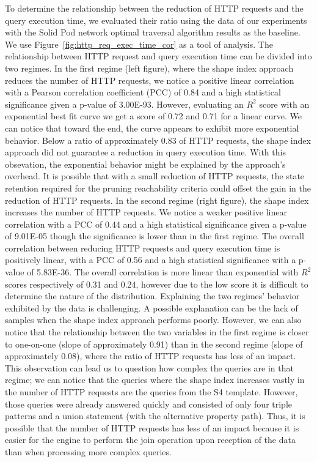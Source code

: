 To determine the relationship between the reduction of HTTP requests and the query execution time, we evaluated their ratio using 
the data of our experiments with the Solid Pod network optimal traversal algorithm results as the baseline.
We use Figure~\ref{fig:http_req_exec_time_cor} as a tool of analysis.
The relationship between HTTP request and query execution time can be divided into two regimes.
In the first regime (left figure), where the shape index approach reduces the number of HTTP requests, we notice a positive linear correlation with a
Pearson correlation coefficient (PCC) of 0.84 and a high statistical significance given a p-value of 3.00E-93.
However, evaluating an $R^2$ score with an exponential best fit curve we get a score of 0.72 and 0.71 for a linear curve.
We can notice that toward the end, the curve appears to exhibit more exponential behavior.
Below a ratio of approximately 0.83 of HTTP requests, the shape index approach did not guarantee a reduction in query execution time.
With this obsevation, the exponential behavior might be explained by the approach's overhead. 
It is possible that with a small reduction of HTTP requests, the state retention required for the pruning reachability criteria could offset the gain in the reduction of HTTP requests.
In the second regime (right figure), the shape index increases the number of HTTP requests.
We notice a weaker positive linear correlation with a PCC of 0.44 and a high statistical significance given a p-value of 9.01E-05 though the significance is lower than in the first regime.
The overall correlation between reducing HTTP requests and query execution time is positively linear, with a PCC of 0.56 and a high statistical significance with a p-value of 5.83E-36.
The overall correlation is more linear than exponential with $R^2$ scores respectively of 0.31 and 0.24, however due to the low score it is difficult to determine the nature of the distribution.
Explaining the two regimes' behavior exhibited by the data is challenging.
A possible explanation can be the lack of samples when the shape index approach performs poorly.
However, we can also notice that the relationship between the two variables in the first regime is closer to one-on-one (slope of approximately 0.91) than in the second regime (slope of approximately 0.08), where the ratio of HTTP requests has less of an impact.
This observation can lead us to question how complex the queries are in that regime; we can notice that the queries where the shape index increases vastly in the number 
of HTTP requests are the queries from the S4 template. 
However, those queries were already answered quickly and consisted of only four triple patterns and a union statement (with the alternative property path). 
Thus, it is possible that the number of HTTP requests has less of an impact because it is easier for the engine to perform the join operation upon reception of the data than when processing more complex queries.


